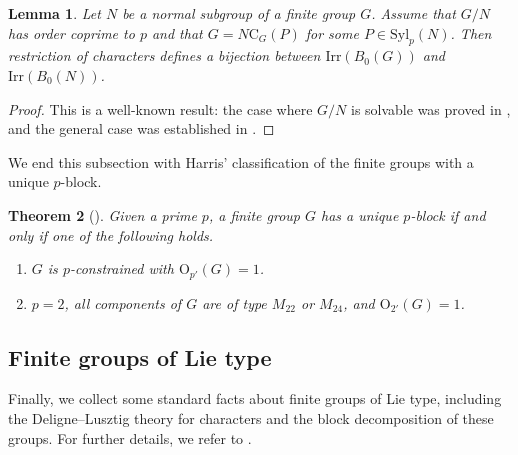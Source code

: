 \documentclass[10pt]{article}
\newtheorem{lem}{\bf Lemma}[section]
\newtheorem{thm}[lem]{\bf Theorem}
\begin{document}
	\begin{lem}\label{lem: isoblock} 
    Let $N$ be a normal subgroup of a finite group $G$.
    Assume that $G/N$ has order coprime to $p$ and that $G=N \mathrm{C}_{G}(P)$ for some $P\in \mathrm{Syl}_{p}(N)$.
    Then restriction of characters defines a bijection between $\mathrm{Irr}(B_{0}(G))$ and $\mathrm{Irr}(B_{0}(N))$.
  \end{lem}
  \begin{proof}
    This is a well-known result: the case where $G/N$ is solvable was proved in \cite{alperin76}, and the general case was established in \cite{dade77}.
\end{proof}

  We end this subsection with Harris' classification of the finite groups with a unique $p$-block.

  
\begin{thm}[\mbox{\cite[Theorem 1]{harris85}}]\label{thm: ub}
  Given a prime $p$,
  a finite group $G$ has a unique $p$-block 
  if and only if one of the following holds.
  \begin{enumerate}[\rm (1)]
       \item $G$ is $p$-constrained with $\mathrm{O}_{p'}(G)=1$. 
    \item $p=2$, all components of $G$ are of type $M_{22}$ or $M_{24}$, and $\mathrm{O}_{2'}(G)=1$.
  \end{enumerate}
\end{thm}











\subsection{Finite groups of Lie type}\label{sec: 2.3}






Finally, we collect some standard facts about finite groups of Lie type, including the Deligne--Lusztig theory for characters
and the block decomposition of these groups.
For further details, 
we refer to \cite{digne91, cabanes04}.
\end{document}
